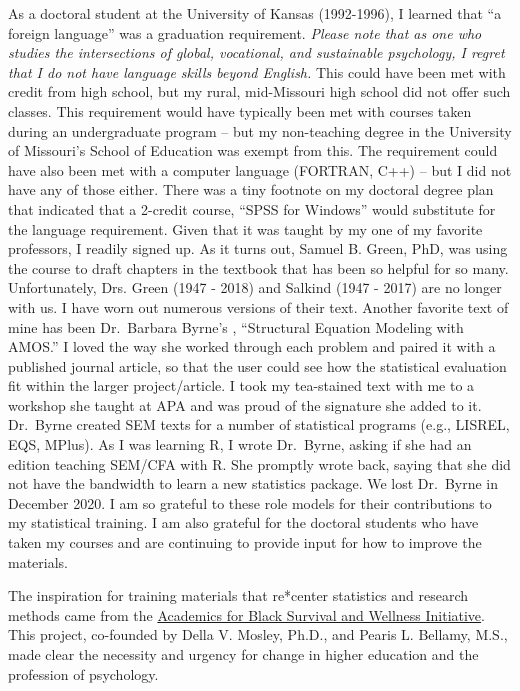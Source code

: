 \documentclass[
  11pt,
]{book}
\begin{document}
As a doctoral student at the University of Kansas (1992-1996), I learned that ``a foreign language'' was a graduation requirement. \emph{Please note that as one who studies the intersections of global, vocational, and sustainable psychology, I regret that I do not have language skills beyond English.} This could have been met with credit from high school, but my rural, mid-Missouri high school did not offer such classes. This requirement would have typically been met with courses taken during an undergraduate program -- but my non-teaching degree in the University of Missouri's School of Education was exempt from this. The requirement could have also been met with a computer language (FORTRAN, C++) -- but I did not have any of those either. There was a tiny footnote on my doctoral degree plan that indicated that a 2-credit course, ``SPSS for Windows'' would substitute for the language requirement. Given that it was taught by my one of my favorite professors, I readily signed up. As it turns out, Samuel B. Green, PhD, was using the course to draft chapters in the textbook \citep{green_using_2014} that has been so helpful for so many. Unfortunately, Drs. Green (1947 - 2018) and Salkind (1947 - 2017) are no longer with us. I have worn out numerous versions of their text. Another favorite text of mine has been Dr.~Barbara Byrne's \citeyearpar{byrne_structural_2016}, ``Structural Equation Modeling with AMOS.'' I loved the way she worked through each problem and paired it with a published journal article, so that the user could see how the statistical evaluation fit within the larger project/article. I took my tea-stained text with me to a workshop she taught at APA and was proud of the signature she added to it. Dr.~Byrne created SEM texts for a number of statistical programs (e.g., LISREL, EQS, MPlus). As I was learning R, I wrote Dr.~Byrne, asking if she had an edition teaching SEM/CFA with R. She promptly wrote back, saying that she did not have the bandwidth to learn a new statistics package. We lost Dr.~Byrne in December 2020. I am so grateful to these role models for their contributions to my statistical training. I am also grateful for the doctoral students who have taken my courses and are continuing to provide input for how to improve the materials.

The inspiration for training materials that re*center statistics and research methods came from the \href{https://www.academics4blacklives.com/}{Academics for Black Survival and Wellness Initiative}. This project, co-founded by Della V. Mosley, Ph.D., and Pearis L. Bellamy, M.S., made clear the necessity and urgency for change in higher education and the profession of psychology.
\end{document}
